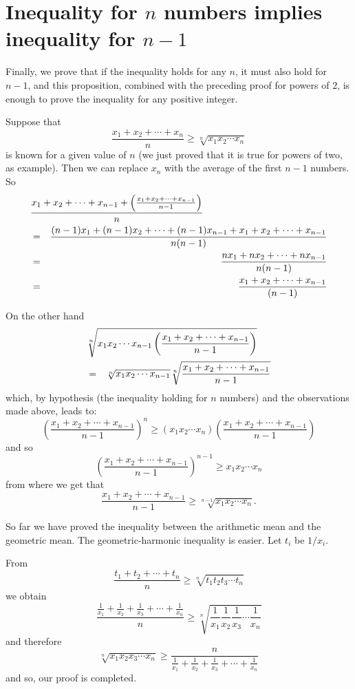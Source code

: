 \documentclass[12pt]{article}
\begin{document}
\section{Inequality for $n$ numbers implies inequality for $n-1$}
Finally, we prove that if the inequality holds for any $n$, it must also hold for $n-1$, and this proposition, combined with the preceding proof for powers of $2$, is enough to prove the inequality for any positive integer.

Suppose that 
$$\frac{x_1+x_2+\cdots+x_n}{n}\geq\sqrt[n]{x_1x_2\cdots x_n}$$
is known for a given value of $n$ (we just proved that it is true for powers of two, as example).
Then we can replace $x_n$ with the average of the first $n-1$ numbers. So
\begin{eqnarray*}
\lefteqn{
\frac{
x_1+x_2+\cdots+x_{n-1}+
\left(\frac{x_1+x_2+\cdots+x_{n-1}}{n-1} \right)
}{n}
}\\
&=&
\frac{(n-1)x_1+(n-1)x_2+\cdots+(n-1)x_{n-1}+x_1+x_2+\cdots+x_{n-1}}{n(n-1)}\\
&=&
\frac{n x_1+ n x_2 + \cdots + n x_{n-1}}{n(n-1)}\\
&=&
\frac{x_1+x_2 + \cdots + x_{n-1}}{(n-1)}
\end{eqnarray*}

On the other hand
\begin{eqnarray*}
\lefteqn{\sqrt[n]{
x_1x_2\cdots x_{n-1}
\left(\frac{x_1+x_2+\cdots+x_{n-1}}{n-1}\right)
}}\\
&=&
\sqrt[n]{x_1x_2\cdots x_{n-1}}
\sqrt[n]{\frac{x_1+x_2+\cdots+x_{n-1}}{n-1}}
\end{eqnarray*}
which, by hypothesis (the inequality holding for $n$ numbers) and the observations made above, leads to:
$$\left(\frac{x_{1}+x_{2}+\cdots+x_{n-1}}{n-1}\right)^{n}\ge 
(x_{1}x_{2}\cdots x_{n})\left(\frac{x_1+x_2+\cdots+x_{n-1}}{n-1}\right)
$$
and so
$$
\left(\frac{x_{1}+x_{2}+\cdots+x_{n-1}}{n-1}\right)^{n-1}\ge 
x_{1}x_{2}\cdots x_{n}
$$
from where we get that 
$$
\frac{x_{1}+x_{2}+\cdots+x_{n-1}}{n-1}\ge\sqrt[n-1]{x_{1}x_{2}\cdots x_{n}}.$$

So far we have proved the inequality between the arithmetic mean and the geometric mean. The geometric-harmonic inequality is easier. Let $t_i$ be $1/x_{i}$.

From 
$$\frac{t_{1}+t_{2}+\cdots+t_{n}}{n}\geq\sqrt[n]{t_{1}t_{2}t_{3}\cdots t_{n}}$$
we obtain
$$\frac{\frac{1}{x_{1}}+\frac{1}{x_{2}}+\frac{1}{x_{3}}+\cdots+\frac{1}{x_{n}}}{n}\geq
\sqrt[n]{\frac{1}{x_{1}}\frac{1}{x_{2}}\frac{1}{x_{3}}\cdots\frac{1}{x_{n}}}$$
and therefore
$$\sqrt[n]{x_{1}x_{2}x_{3}\cdots x_{n}}\geq
\frac{n}{
\frac{1}{x_{1}}+\frac{1}{x_{2}}+\frac{1}{x_{3}}+\cdots+\frac{1}{x_{n}}
}$$
and so, our proof is completed.
\end{document}
